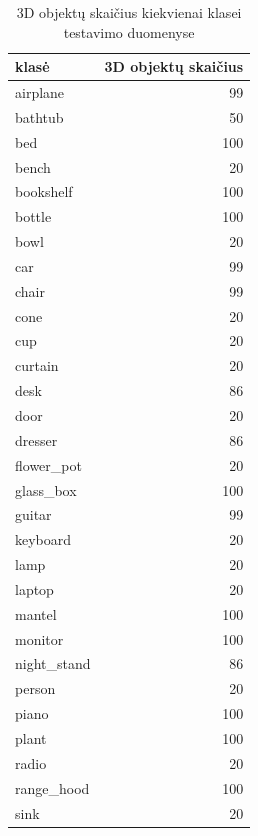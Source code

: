 \begin{table}[]
\caption{3D objektų skaičius kiekvienai klasei testavimo duomenyse}
\begin{tabular}{lr}
	klasė       &   3D objektų skaičius \\
	\hline
	airplane    &                    99 \\
	bathtub     &                    50 \\
	bed         &                   100 \\
	bench       &                    20 \\
	bookshelf   &                   100 \\
	bottle      &                   100 \\
	bowl        &                    20 \\
	car         &                    99 \\
	chair       &                    99 \\
	cone        &                    20 \\
	cup         &                    20 \\
	curtain     &                    20 \\
	desk        &                    86 \\
	door        &                    20 \\
	dresser     &                    86 \\
	flower\_pot  &                    20 \\
	glass\_box   &                   100 \\
	guitar      &                    99 \\
	keyboard    &                    20 \\
	lamp        &                    20 \\
	laptop      &                    20 \\
	mantel      &                   100 \\
	monitor     &                   100 \\
	night\_stand &                    86 \\
	person      &                    20 \\
	piano       &                   100 \\
	plant       &                   100 \\
	radio       &                    20 \\
	range\_hood  &                   100 \\
	sink        &                    20 \\

\end{tabular}
\end{table}

